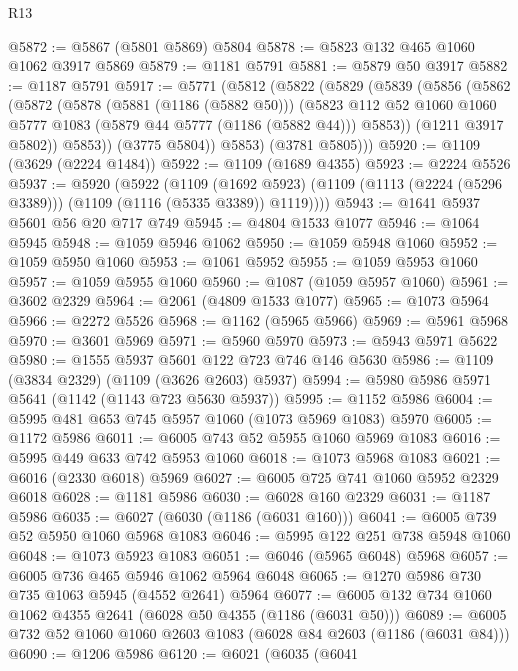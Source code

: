 \begin{lexlean}{R13}
\begin{coremodule}
@5872 := @5867 (@5801 @5869) @5804
@5878 := @5823 @132 @465 @1060 @1062 @3917 @5869
@5879 := @1181 @5791
@5881 := @5879 @50 @3917
@5882 := @1187 @5791
@5917 := @5771
    (@5812
      (@5822
        (@5829
          (@5839
            (@5856
              (@5862
                (@5872
                  (@5878
                    (@5881 (@1186 (@5882 @50)))
                    (@5823
                      @112
                      @52
                      @1060
                      @1060
                      @5777
                      @1083
                      (@5879 @44 @5777 (@1186 (@5882 @44)))
                      @5853))
                  (@1211 @3917 @5802))
                @5853))
            (@3775 @5804))
          @5853)
        (@3781 @5805)))
@5920 := @1109 (@3629 (@2224 @1484))
@5922 := @1109 (@1689 @4355)
@5923 := @2224 @5526
@5937 := @5920
    (@5922
      (@1109
        (@1692 @5923)
        (@1109 (@1113 (@2224 (@5296 @3389))) (@1109 (@1116 (@5335 @3389)) @1119))))
@5943 := @1641 @5937 @5601 @56 @20 @717 @749
@5945 := @4804 @1533 @1077
@5946 := @1064 @5945
@5948 := @1059 @5946 @1062
@5950 := @1059 @5948 @1060
@5952 := @1059 @5950 @1060
@5953 := @1061 @5952
@5955 := @1059 @5953 @1060
@5957 := @1059 @5955 @1060
@5960 := @1087 (@1059 @5957 @1060)
@5961 := @3602 @2329
@5964 := @2061 (@4809 @1533 @1077)
@5965 := @1073 @5964
@5966 := @2272 @5526
@5968 := @1162 (@5965 @5966)
@5969 := @5961 @5968
@5970 := @3601 @5969
@5971 := @5960 @5970
@5973 := @5943 @5971 @5622
@5980 := @1555 @5937 @5601 @122 @723 @746 @146 @5630
@5986 := @1109 (@3834 @2329) (@1109 (@3626 @2603) @5937)
@5994 := @5980 @5986 @5971 @5641 (@1142 (@1143 @723 @5630 @5937))
@5995 := @1152 @5986
@6004 := @5995 @481 @653 @745 @5957 @1060 (@1073 @5969 @1083) @5970
@6005 := @1172 @5986
@6011 := @6005 @743 @52 @5955 @1060 @5969 @1083
@6016 := @5995 @449 @633 @742 @5953 @1060
@6018 := @1073 @5968 @1083
@6021 := @6016 (@2330 @6018) @5969
@6027 := @6005 @725 @741 @1060 @5952 @2329 @6018
@6028 := @1181 @5986
@6030 := @6028 @160 @2329
@6031 := @1187 @5986
@6035 := @6027 (@6030 (@1186 (@6031 @160)))
@6041 := @6005 @739 @52 @5950 @1060 @5968 @1083
@6046 := @5995 @122 @251 @738 @5948 @1060
@6048 := @1073 @5923 @1083
@6051 := @6046 (@5965 @6048) @5968
@6057 := @6005 @736 @465 @5946 @1062 @5964 @6048
@6065 := @1270 @5986 @730 @735 @1063 @5945 (@4552 @2641) @5964
@6077 := @6005 @132 @734 @1060 @1062 @4355 @2641 (@6028 @50 @4355 (@1186 (@6031 @50)))
@6089 := @6005 @732 @52 @1060 @1060 @2603 @1083 (@6028 @84 @2603 (@1186 (@6031 @84)))
@6090 := @1206 @5986
@6120 := @6021
    (@6035
      (@6041

\end{coremodule}
\end{lexlean}
